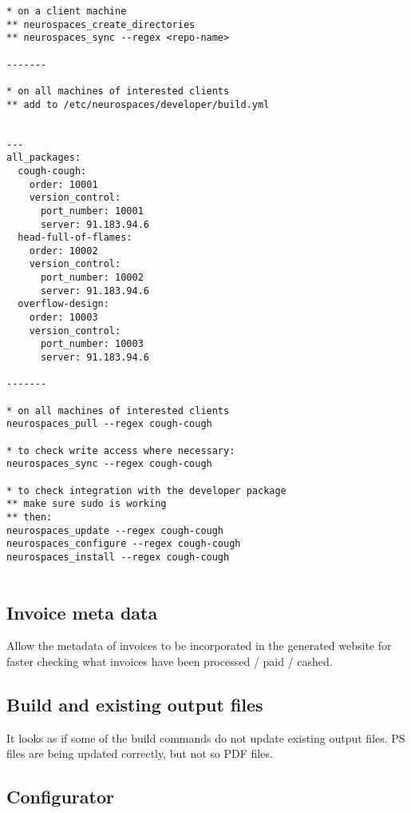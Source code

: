 \documentclass[12pt]{article}
\begin{document}
\begin{verbatim}
* on a client machine
** neurospaces_create_directories
** neurospaces_sync --regex <repo-name>

-------

* on all machines of interested clients
** add to /etc/neurospaces/developer/build.yml


---
all_packages:
  cough-cough:
    order: 10001
    version_control:
      port_number: 10001
      server: 91.183.94.6
  head-full-of-flames:
    order: 10002
    version_control:
      port_number: 10002
      server: 91.183.94.6
  overflow-design:
    order: 10003
    version_control:
      port_number: 10003
      server: 91.183.94.6

-------

* on all machines of interested clients
neurospaces_pull --regex cough-cough

* to check write access where necessary:
neurospaces_sync --regex cough-cough

* to check integration with the developer package
** make sure sudo is working
** then:
neurospaces_update --regex cough-cough
neurospaces_configure --regex cough-cough
neurospaces_install --regex cough-cough


\end{verbatim}

\subsection{Invoice meta data}

Allow the metadata of invoices to be incorporated in the generated
website for faster checking what invoices have been processed / paid /
cashed.


\subsection{Build and existing output files}

It looks as if some of the build commands do not update existing
output files.  PS files are being updated correctly, but not so PDF
files.


\subsection{Configurator}
\end{document}
